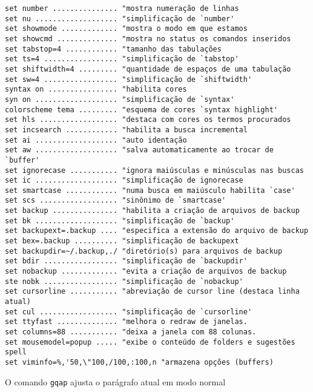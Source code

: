 \begin{verbatim}
set number ............... "mostra numeração de linhas
set nu ................... "simplificação de `number'
set showmode ............. "mostra o modo em que estamos
set showcmd .............. "mostra no status os comandos inseridos
set tabstop=4 ............ "tamanho das tabulações
set ts=4 ................. "simplificação de `tabstop'
set shiftwidth=4 ......... "quantidade de espaços de uma tabulação
set sw=4 ................. "simplificação de `shiftwidth'
syntax on ................ "habilita cores
syn on ................... "simplificação de `syntax'
colorscheme tema ......... "esquema de cores `syntax highlight'
set hls .................. "destaca com cores os termos procurados
set incsearch ............ "habilita a busca incremental
set ai ................... "auto identação
set aw ................... "salva automaticamente ao trocar de `buffer'
set ignorecase ........... "ignora maiúsculas e minúsculas nas buscas
set ic ................... "simplificação de ignorecase
set smartcase ............ "numa busca em maiúsculo habilita `case'
set scs .................. "sinônimo de `smartcase'
set backup ............... "habilita a criação de arquivos de backup
set bk ................... "simplificação de `backup'
set backupext=.backup .... "especifica a extensão do arquivo de backup
set bex=.backup .......... "simplificação de backupext
set backupdir=~/.backup,./ "diretório(s) para arquivos de backup
set bdir ................. "simplificação de `backupdir'
set nobackup ............. "evita a criação de arquivos de backup
ste nobk ................. "simplificação de `nobackup'
set cursorline ........... "abreviação de cursor line (destaca linha atual)
set cul .................. "simplificação de `cursorline'
set ttyfast .............. "melhora o redraw de janelas.
set columns=88 ........... "deixa a janela com 88 colunas.
set mousemodel=popup ..... "exibe o conteúdo de folders e sugestões spell
set viminfo=%,'50,\"100,/100,:100,n "armazena opções (buffers)
\end{verbatim}

O comando \verb|gqap| ajusta o parágrafo atual em modo normal

